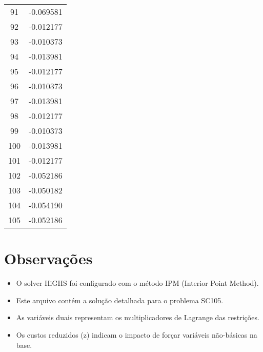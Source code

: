 \documentclass[12pt]{article}
\begin{document}
\begin{longtable}{@{}cc@{}}
91 & -0.069581 \\
92 & -0.012177 \\
93 & -0.010373 \\
94 & -0.013981 \\
95 & -0.012177 \\
96 & -0.010373 \\
97 & -0.013981 \\
98 & -0.012177 \\
99 & -0.010373 \\
100 & -0.013981 \\
101 & -0.012177 \\
102 & -0.052186 \\
103 & -0.050182 \\
104 & -0.054190 \\
105 & -0.052186 \\

\end{longtable}


\section{Observações}

\begin{itemize}
\item O solver HiGHS foi configurado com o método IPM (Interior Point Method).
\item Este arquivo contém a solução detalhada para o problema SC105.
\item As variáveis duais representam os multiplicadores de Lagrange das restrições.
\item Os custos reduzidos (z) indicam o impacto de forçar variáveis não-básicas na base.
\end{itemize}
\end{document}
